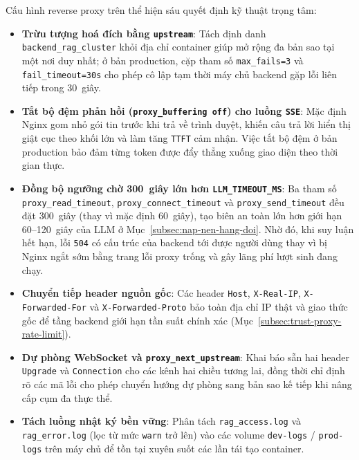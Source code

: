 Cấu hình reverse proxy trên thể hiện sáu quyết định kỹ thuật trọng tâm:
\begin{itemize}[label=--]
    \item \textbf{Trừu tượng hoá đích bằng \texttt{upstream}}: Tách định danh \texttt{backend\_\allowbreak{}rag\_\allowbreak{}cluster} khỏi địa chỉ container giúp mở rộng đa bản sao tại một nơi duy nhất; ở bản production, cặp tham số \texttt{max\_\allowbreak{}fails=3} và \texttt{fail\_\allowbreak{}timeout=30s} cho phép cô lập tạm thời máy chủ backend gặp lỗi liên tiếp trong 30~giây.
    \item \textbf{Tắt bộ đệm phản hồi (\texttt{proxy\_\allowbreak{}buffering off}) cho luồng \texttt{SSE}}: Mặc định Nginx gom nhỏ gói tin trước khi trả về trình duyệt, khiến câu trả lời hiển thị giật cục theo khối lớn và làm tăng \texttt{TTFT} cảm nhận. Việc tắt bộ đệm ở bản production bảo đảm từng token được đẩy thẳng xuống giao diện theo thời gian thực.
    \item \textbf{Đồng bộ ngưỡng chờ 300~giây lớn hơn \texttt{LLM\_\allowbreak{}TIMEOUT\_\allowbreak{}MS}}: Ba tham số \texttt{proxy\_\allowbreak{}read\_\allowbreak{}timeout}, \texttt{proxy\_\allowbreak{}connect\_\allowbreak{}timeout} và \texttt{proxy\_\allowbreak{}send\_\allowbreak{}timeout} đều đặt 300~giây (thay vì mặc định 60~giây), tạo biên an toàn lớn hơn giới hạn 60--120~giây của LLM ở Mục~\ref{subsec:nap-nen-hang-doi}. Nhờ đó, khi suy luận hết hạn, lỗi \texttt{504} có cấu trúc của backend tới được người dùng thay vì bị Nginx ngắt sớm bằng trang lỗi proxy trống và gây lãng phí lượt sinh đang chạy.
    \item \textbf{Chuyển tiếp header nguồn gốc}: Các header \texttt{Host}, \texttt{X-\allowbreak{}Real-\allowbreak{}IP}, \texttt{X-\allowbreak{}Forwarded-\allowbreak{}For} và \texttt{X-\allowbreak{}Forwarded-\allowbreak{}Proto} bảo toàn địa chỉ IP thật và giao thức gốc để tầng backend giới hạn tần suất chính xác (Mục~\ref{subsec:trust-proxy-rate-limit}).
    \item \textbf{Dự phòng WebSocket và \texttt{proxy\_\allowbreak{}next\_\allowbreak{}upstream}}: Khai báo sẵn hai header \texttt{Upgrade} và \texttt{Connection} cho các kênh hai chiều tương lai, đồng thời chỉ định rõ các mã lỗi cho phép chuyển hướng dự phòng sang bản sao kế tiếp khi nâng cấp cụm đa thực thể.
    \item \textbf{Tách luồng nhật ký bền vững}: Phân tách \texttt{rag\_\allowbreak{}access.\allowbreak{}log} và \texttt{rag\_\allowbreak{}error.\allowbreak{}log} (lọc từ mức \texttt{warn} trở lên) vào các volume \texttt{dev-\allowbreak{}logs} / \texttt{prod-\allowbreak{}logs} trên máy chủ để tồn tại xuyên suốt các lần tái tạo container.
\end{itemize}

